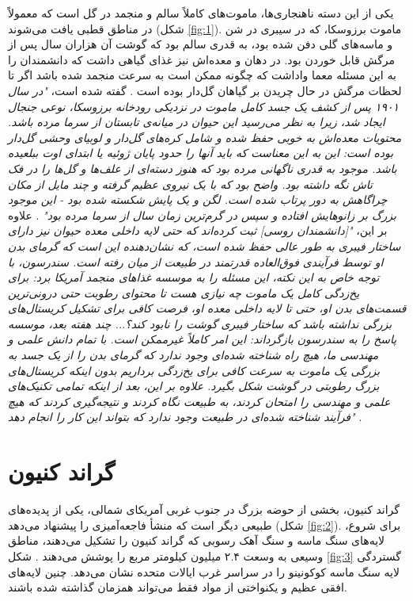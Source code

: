 \documentclass[10pt,twocolumn,letterpaper]{article}
\begin{document}
یکی از این دسته ناهنجاری‌ها، ماموت‌های کاملاً سالم و منجمد در گل است که معمولاً در مناطق قطبی یافت می‌شوند (شکل \ref{fig:1}). ماموت برزوسکا، که در سیبری در شن‌ و ماسه‌های گلی دفن شده بود، به قدری سالم بود که گوشت آن هزاران سال پس از مرگش قابل خوردن بود. در دهان و معده‌اش نیز غذای گیاهی داشت که دانشمندان را به این مسئله معما وا‌داشت که چگونه ممکن است به سرعت منجمد شده باشد اگر تا لحظات مرگش در حال چریدن بر گیاهان گل‌دار بوده است \cite{17}. گفته شده است، \textit{"در سال ۱۹۰۱ پس از کشف یک جسد کامل ماموت در نزدیکی رودخانه برزوسکا، نوعی جنجال ایجاد شد، زیرا به نظر می‌رسید این حیوان در میانه‌ی تابستان از سرما مرده باشد. محتویات معده‌اش به خوبی حفظ شده و شامل کره‌های گل‌دار و لوبیای وحشی گل‌دار بوده است: این به این معناست که باید آنها را حدود پایان ژوئیه یا ابتدای اوت ببلعیده باشد. موجود به قدری ناگهانی مرده بود که هنوز دسته‌ای از علف‌ها و گل‌ها را در فک تاش نگه‌ داشته بود. واضح بود که با یک نیروی عظیم گرفته و چند مایل از مکان چراگاهش به دور پرتاب شده است. لگن و یک پایش شکسته شده بود - این موجود بزرگ بر زانوهایش افتاده و سپس در گرم‌ترین زمان سال از سرما مرده بود"} \cite{18}. علاوه بر این، \textit{"[دانشمندان روسی] ثبت کرده‌اند که حتی لایه داخلی معده حیوان نیز دارای ساختار فیبری به طور عالی حفظ شده‌ است، که نشان‌دهنده این است که گرمای بدن او توسط فرآیندی فوق‌العاده قدرتمند در طبیعت از میان رفته است. سندرسون، با توجه خاص به این نکته، این مسئله را به موسسه غذاهای منجمد آمریکا برد: برای یخ‌زدگی کامل یک ماموت چه نیازی هست تا محتوای رطوبت حتی درونی‌ترین قسمت‌های بدن او، حتی تا لایه داخلی معده او، فرصت کافی برای تشکیل کریستال‌های بزرگی نداشته باشد که ساختار فیبری گوشت را نابود کند؟... چند هفته بعد، موسسه پاسخ را به سندرسون بازگرداند: این امر کاملاً غیرممکن است. با تمام دانش علمی و مهندسی ما، هیچ راه شناخته شده‌ای وجود ندارد که گرمای بدن را از یک جسد به بزرگی یک ماموت به سرعت کافی برای یخ‌زدگی برداریم بدون اینکه کریستال‌های بزرگ رطوبتی در گوشت شکل بگیرد. علاوه بر این، بعد از اینکه تمامی تکنیک‌های علمی و مهندسی را امتحان کردند، به طبیعت نگاه کردند و نتیجه‌گیری کردند که هیچ فرآیند شناخته شده‌ای در طبیعت وجود ندارد که بتواند این کار را انجام دهد"} \cite{19}.

\section{گراند کنیون}

گراند کنیون، بخشی از حوضه بزرگ در جنوب غربی آمریکای شمالی، یکی از پدیده‌های طبیعی دیگر است که منشأ فاجعه‌آمیزی را پیشنهاد می‌دهد (شکل \ref{fig:2}). برای شروع، لایه‌های سنگ ماسه و سنگ آهک رسوبی که گراند کنیون را تشکیل می‌دهند، مناطق وسیعی به وسعت ۲.۴ میلیون کیلومتر مربع را پوشش می‌دهند \cite{21}. شکل \ref{fig:3} گستردگی لایه سنگ ماسه کوکونینو را در سراسر غرب ایالات متحده نشان می‌دهد. چنین لایه‌های افقی عظیم و یکنواختی از مواد فقط می‌تواند همزمان گذاشته شده باشند.
\end{document}
